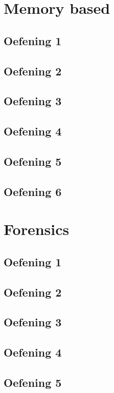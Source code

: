\documentclass[a4paper,11pt]{report}
\begin{document}
\chapter{Memory based}
\section{Oefening 1}

\section{Oefening 2}

\section{Oefening 3}

\section{Oefening 4}

\section{Oefening 5}

\section{Oefening 6}


\newpage

\chapter{Forensics}
\section{Oefening 1}

\section{Oefening 2}

\section{Oefening 3}

\section{Oefening 4}

\section{Oefening 5}

\end{document}
